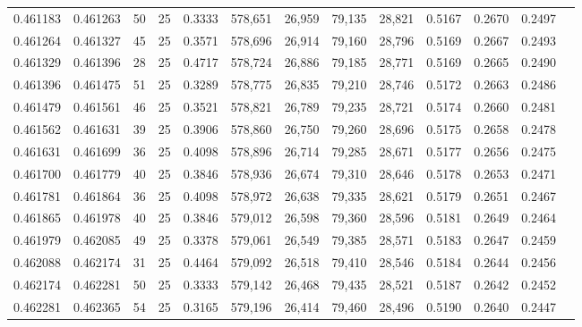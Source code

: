 \begin{tabular}{rrrrrrrrrrrrr}
0.461183 & 0.461263 &    50 &  25 &                                     0.3333 & 578,651 &  26,959 &  79,135 &  28,821 & 0.5167 & 0.2670 & 0.2497 \\
0.461264 & 0.461327 &    45 &  25 &                                     0.3571 & 578,696 &  26,914 &  79,160 &  28,796 & 0.5169 & 0.2667 & 0.2493 \\
0.461329 & 0.461396 &    28 &  25 &                                     0.4717 & 578,724 &  26,886 &  79,185 &  28,771 & 0.5169 & 0.2665 & 0.2490 \\
0.461396 & 0.461475 &    51 &  25 &                                     0.3289 & 578,775 &  26,835 &  79,210 &  28,746 & 0.5172 & 0.2663 & 0.2486 \\
0.461479 & 0.461561 &    46 &  25 &                                     0.3521 & 578,821 &  26,789 &  79,235 &  28,721 & 0.5174 & 0.2660 & 0.2481 \\
0.461562 & 0.461631 &    39 &  25 &                                     0.3906 & 578,860 &  26,750 &  79,260 &  28,696 & 0.5175 & 0.2658 & 0.2478 \\
0.461631 & 0.461699 &    36 &  25 &                                     0.4098 & 578,896 &  26,714 &  79,285 &  28,671 & 0.5177 & 0.2656 & 0.2475 \\
0.461700 & 0.461779 &    40 &  25 &                                     0.3846 & 578,936 &  26,674 &  79,310 &  28,646 & 0.5178 & 0.2653 & 0.2471 \\
0.461781 & 0.461864 &    36 &  25 &                                     0.4098 & 578,972 &  26,638 &  79,335 &  28,621 & 0.5179 & 0.2651 & 0.2467 \\
0.461865 & 0.461978 &    40 &  25 &                                     0.3846 & 579,012 &  26,598 &  79,360 &  28,596 & 0.5181 & 0.2649 & 0.2464 \\
0.461979 & 0.462085 &    49 &  25 &                                     0.3378 & 579,061 &  26,549 &  79,385 &  28,571 & 0.5183 & 0.2647 & 0.2459 \\
0.462088 & 0.462174 &    31 &  25 &                                     0.4464 & 579,092 &  26,518 &  79,410 &  28,546 & 0.5184 & 0.2644 & 0.2456 \\
0.462174 & 0.462281 &    50 &  25 &                                     0.3333 & 579,142 &  26,468 &  79,435 &  28,521 & 0.5187 & 0.2642 & 0.2452 \\
0.462281 & 0.462365 &    54 &  25 &                                     0.3165 & 579,196 &  26,414 &  79,460 &  28,496 & 0.5190 & 0.2640 & 0.2447 \\

\end{tabular}
